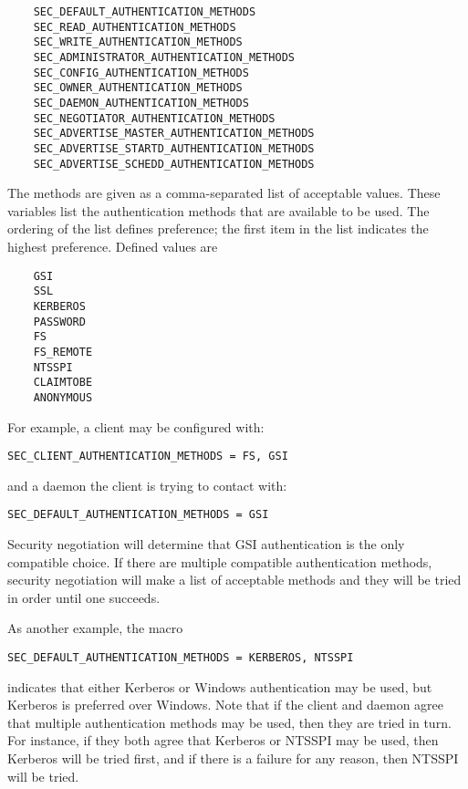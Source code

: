 \begin{verbatim}
    SEC_DEFAULT_AUTHENTICATION_METHODS
    SEC_READ_AUTHENTICATION_METHODS
    SEC_WRITE_AUTHENTICATION_METHODS
    SEC_ADMINISTRATOR_AUTHENTICATION_METHODS
    SEC_CONFIG_AUTHENTICATION_METHODS
    SEC_OWNER_AUTHENTICATION_METHODS
    SEC_DAEMON_AUTHENTICATION_METHODS
    SEC_NEGOTIATOR_AUTHENTICATION_METHODS
    SEC_ADVERTISE_MASTER_AUTHENTICATION_METHODS
    SEC_ADVERTISE_STARTD_AUTHENTICATION_METHODS
    SEC_ADVERTISE_SCHEDD_AUTHENTICATION_METHODS
\end{verbatim}
The methods are
given as a comma-separated list of acceptable values.
These variables list the authentication methods that are available
to be used.
The ordering of the list defines preference;
the first item in the list indicates the highest preference.
Defined values are
\begin{verbatim}
    GSI
    SSL
    KERBEROS
    PASSWORD
    FS
    FS_REMOTE
    NTSSPI
    CLAIMTOBE
    ANONYMOUS
\end{verbatim}

For example, a client may be configured with:
\begin{verbatim}
SEC_CLIENT_AUTHENTICATION_METHODS = FS, GSI
\end{verbatim}
and a daemon the client is trying to contact with:
\begin{verbatim}
SEC_DEFAULT_AUTHENTICATION_METHODS = GSI
\end{verbatim}

Security negotiation will determine that GSI authentication is the only
compatible choice. If there are multiple compatible authentication
methods, security negotiation will make a list of acceptable methods and
they will be tried in order until one succeeds. 

As another example, the macro
\begin{verbatim}
SEC_DEFAULT_AUTHENTICATION_METHODS = KERBEROS, NTSSPI
\end{verbatim}
indicates that either Kerberos or Windows authentication may be used,
but Kerberos is preferred over Windows.
Note that if the client and daemon agree that multiple authentication
methods may be used, then they are tried in turn. For instance, if
they both agree that Kerberos or NTSSPI may be used, then Kerberos
will be tried first, and if there is a failure for any reason, then
NTSSPI will be tried. 


